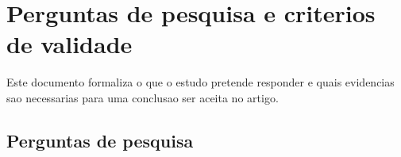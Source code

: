 

\chapter{Perguntas de pesquisa e criterios de validade}




Este documento formaliza o que o estudo pretende responder e quais evidencias sao necessarias para uma conclusao ser aceita no artigo.



\section{Perguntas de pesquisa}




